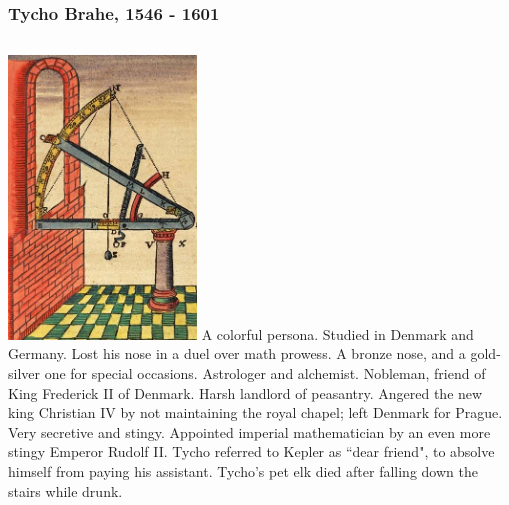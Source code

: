 \documentclass[aspectratio=169,xcolor=pdftex,dvipsnames]{beamer} %
\begin{document}
\begin{frame}
\frametitle{Tycho Brahe, 1546 - 1601}

\centering
\begin{columns}
\includegraphics[width=50mm]{sextant.jpg}            
A colorful persona. Studied in Denmark and Germany. Lost his nose in a duel over math prowess. 
A bronze nose, and a gold-silver one for special occasions.
Astrologer and alchemist. Nobleman, friend of King Frederick II of Denmark. Harsh landlord of peasantry. Angered the new king Christian IV by not maintaining the royal chapel; left Denmark for Prague. Very secretive and stingy. Appointed imperial mathematician by an even more stingy Emperor Rudolf II. Tycho referred to Kepler as ``dear friend", to absolve himself from paying his assistant. Tycho's pet elk died after falling down the stairs while drunk.
\end{columns} 

\end{frame}
\end{document}
